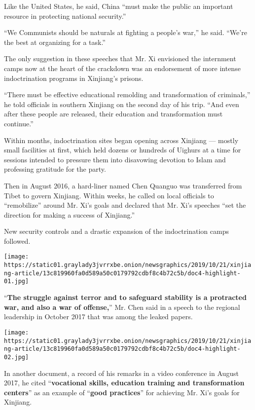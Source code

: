 Like the United States, he said, China ``must make the public an
important resource in protecting national security.''

``We Communists should be naturals at fighting a people's war,'' he
said. ``We're the best at organizing for a task.''

The only suggestion in these speeches that Mr. Xi envisioned the
internment camps now at the heart of the crackdown was an endorsement of
more intense indoctrination programs in Xinjiang's prisons.

``There must be effective educational remolding and transformation of
criminals,'' he told officials in southern Xinjiang on the second day of
his trip. ``And even after these people are released, their education
and transformation must continue.''

Within months, indoctrination sites began opening across Xinjiang ---
mostly small facilities at first, which held dozens or hundreds of
Uighurs at a time for sessions intended to pressure them into disavowing
devotion to Islam and professing gratitude for the party.

Then in August 2016, a hard-liner named Chen Quanguo was transferred
from Tibet to govern Xinjiang. Within weeks, he called on local
officials to ``remobilize'' around Mr. Xi's goals and declared that Mr.
Xi's speeches ``set the direction for making a success of Xinjiang.''

New security controls and a drastic expansion of the indoctrination
camps followed.

\texttt{[image: https://static01.graylady3jvrrxbe.onion/newsgraphics/2019/10/21/xinjiang-article/13c819960fa0d589a50c0179792cdbf8c4b72c5b/doc4-highlight-01.jpg]}

``\textbf{The struggle against terror and to safeguard stability is a
protracted war, and also a war of offense,}'' Mr. Chen said in a speech
to the regional leadership in October 2017 that was among the leaked
papers.

\texttt{[image: https://static01.graylady3jvrrxbe.onion/newsgraphics/2019/10/21/xinjiang-article/13c819960fa0d589a50c0179792cdbf8c4b72c5b/doc4-highlight-02.jpg]}

In another document, a record of his remarks in a video conference in
August 2017, he cited ``\textbf{vocational skills, education training
and transformation centers}'' as an example of ``\textbf{good
practices}'' for achieving Mr. Xi's goals for Xinjiang.

​

